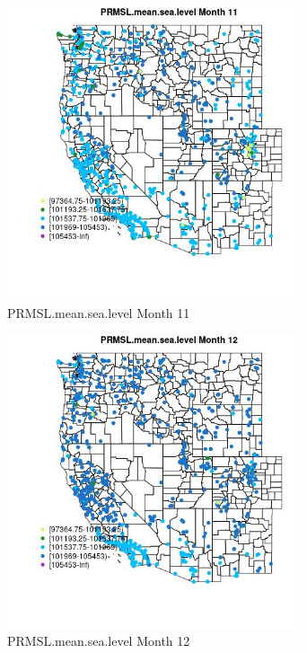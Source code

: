 \begin{figure} 
\centering  
\includegraphics[width=0.77\textwidth]{Code_Outputs/Report_ML_input_PM25_Step4_part_f_de_duplicated_aveswNAs_MapObsMo11PRMSLmeansealevel.jpg} 
\caption{\label{fig:Report_ML_input_PM25_Step4_part_f_de_duplicated_aveswNAsMapObsMo11PRMSLmeansealevel}PRMSL.mean.sea.level Month 11} 
\end{figure} 
 

\clearpage 

\begin{figure} 
\centering  
\includegraphics[width=0.77\textwidth]{Code_Outputs/Report_ML_input_PM25_Step4_part_f_de_duplicated_aveswNAs_MapObsMo12PRMSLmeansealevel.jpg} 
\caption{\label{fig:Report_ML_input_PM25_Step4_part_f_de_duplicated_aveswNAsMapObsMo12PRMSLmeansealevel}PRMSL.mean.sea.level Month 12} 
\end{figure} 
 

